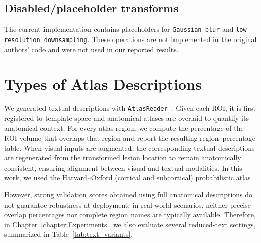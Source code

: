 \documentclass[FCD_GNN.tex]{subfiles}
\begin{document}
\subsection*{Disabled/placeholder transforms}
The current implementation contains placeholders for \texttt{Gaussian blur} and \texttt{low–resolution downsampling}.
These operations are not implemented in the original authors’ code and were not used in our reported results.

\section{Types of Atlas Descriptions}

We generated textual descriptions with \texttt{AtlasReader}~\cite{notter2019atlasreader}.
Given each ROI, it is first registered to template space and anatomical atlases are overlaid to quantify its anatomical context.
For every atlas region, we compute the percentage of the ROI volume that overlaps that region and report the resulting region–percentage table.
When visual inputs are augmented, the corresponding textual descriptions are regenerated from the transformed lesion location to remain anatomically consistent, ensuring alignment between visual and textual modalities.
In this work, we used the Harvard--Oxford (cortical and subcortical) probabilistic atlas~\cite{harvardoxford_rrid}.

However, strong validation scores obtained using full anatomical descriptions do not guarantee 
robustness at deployment: in real-world scenarios, neither precise overlap percentages nor complete 
region names are typically available. Therefore, in Chapter~\ref{chapter:Experiments}, we also evaluate 
several reduced-text settings, summarized in Table~\ref{tab:text_variants}.
\end{document}
